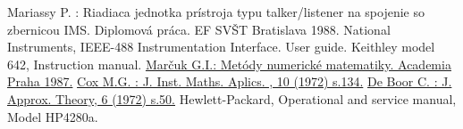 \begin{thebibliography}{}
 Mariassy P. : Riadiaca jednotka prístroja typu
  talker/listener na spojenie so zbernicou IMS. Diplomová práca. EF
  SVŠT Bratislava 1988.
 National Instruments, IEEE-488 Instrumentation
  Interface. User guide.
 Keithley model 642, Instruction manual.
  \href{http://www.databazeknih.cz/knihy/metody-numericke-matematiky-128914}{Marčuk
    G.I.: Metódy numerické matematiky. Academia Praha 1987.}
  \href{http://imamat.oxfordjournals.org/content/10/2/134.abstract}{Cox
    M.G. : J. Inst. Maths. Aplics. , 10 (1972) s.134.}
  \href{https://web.stanford.edu/class/cme324/classics/deboor.pdf}{De
    Boor C. : J. Approx. Theory, 6 (1972) s.50.}
 Hewlett-Packard, Operational and service manual,
  Model HP4280a.
\end{thebibliography}
